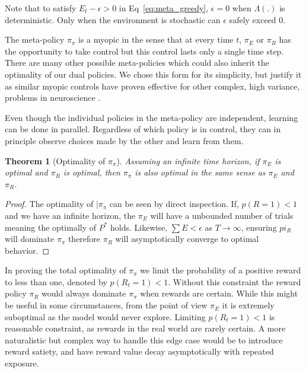 \documentclass[9pt,twocolumn,twoside]{pnas-new}
\newtheorem{theorem}{Theorem}
\begin{document}
Note that to satisfy $E_t - \epsilon > 0$ in Eq~\ref{eq:meta_greedy}, $\epsilon = 0$ when $\Lambda(.)$ is deterministic. Only when the environment is stochastic can $\epsilon$ safely exceed 0.

The meta-policy $\pi_{\pi}$ is a myopic in the sense that at every time $t$, $\pi_E$ or $\pi_R$ has the opportunity to take control but this control lasts only a single time step. There are many other possible meta-policies which could also inherit the optimality of our dual policies. We chose this form for its simplicity, but justify it as similar myopic controls have proven effective for other complex, high variance, problems in neuroscience \cite{Hocker2019}.

Even though the individual policies in the meta-policy are independent, learning can be done in parallel. Regardless of which policy is in control, they can in principle observe choices made by the other and learn from them.   

\begin{theorem}[Optimality of $\pi_{\pi}$] \label{theorem:meta}
    Assuming an infinite time horizon, if $\pi_E$ is optimal and $\pi_R$ is optimal, then $\pi_{\pi}$ is also optimal in the same sense as $\pi_E$ and $\pi_R$.
\end{theorem}
\begin{proof}
    The optimality of $|\pi_{\pi}$ can be seen by direct inspection. If, $p(R = 1) < 1$ and we have an infinite horizon, the $\pi_E$ will have a unbounded number of trials meaning the optimally of $P^*$ holds. Likewise, $\sum E < \epsilon$ as $T \rightarrow \infty$, ensuring $pi_R$ will dominate $\pi_{\pi}$ therefore $\pi_R$ will asymptotically converge to optimal behavior.
\end{proof}

In proving the total optimality of $\pi_{\pi}$ we limit the probability of a positive reward to less than one, denoted by $p(R_t = 1) < 1$. Without this constraint the reward policy $\pi_R$ would always dominate $\pi_{\pi}$ when rewards are certain. While this might be useful in some circumstances, from the point of view $\pi_E$ it is extremely suboptimal as the model would never explore. Limiting $p(R_t = 1) < 1$ is reasonable constraint, as rewards in the real world are rarely certain. A more naturalistic but complex way to handle this edge case would be to introduce reward satiety, and have reward value decay asymptotically with repeated exposure. 
\end{document}
